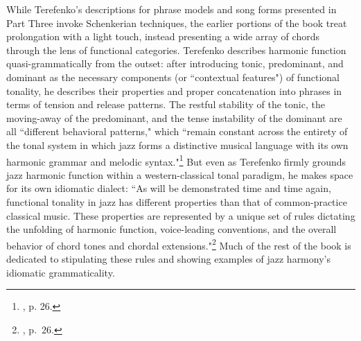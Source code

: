 While Terefenko's descriptions for phrase models and song forms presented in Part Three invoke Schenkerian techniques, the earlier portions of the book treat prolongation with a light touch, instead presenting a wide array of chords through the lens of functional categories.  Terefenko describes harmonic function quasi-grammatically from the outset:  after introducing tonic, predominant, and dominant as the necessary components (or ``contextual features") of functional tonality, he describes their properties and proper concatenation into phrases in terms of tension and release patterns.  The restful stability of the tonic, the moving-away of the predominant, and the tense instability of the dominant are all ``different behavioral patterns," which ``remain constant across the entirety of the tonal system in which jazz forms a distinctive musical language with its own harmonic grammar and melodic syntax."\footnote{\cite{terefenko2014}, p. 26.}  But even as Terefenko firmly grounds jazz harmonic function within a western-classical tonal paradigm, he makes space for its own idiomatic dialect: ``As will be demonstrated time and time again, functional tonality in jazz has different properties than that of common-practice classical music.  These properties are represented by a unique set of rules dictating the unfolding of harmonic function, voice-leading conventions, and the overall behavior of chord tones and chordal extensions."\footnote{\cite{terefenko2014}, p.\ 26.}  Much of the rest of the book is dedicated to stipulating these rules and showing examples of jazz harmony's idiomatic grammaticality.

